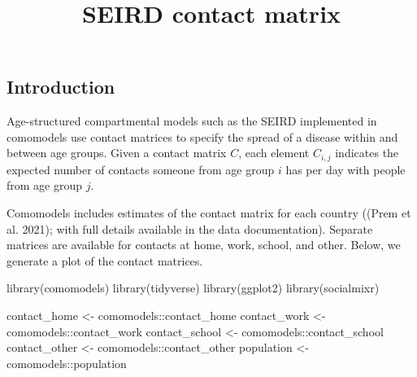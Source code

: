 \documentclass[
]{article}
\title{SEIRD contact matrix}
\author{}
\date{\vspace{-2.5em}}
\newenvironment{Shaded}{\begin{snugshade}}{\end{snugshade}}
\newcommand{\FunctionTok}[1]{\textcolor[rgb]{0.00,0.00,0.00}{#1}}
\newcommand{\NormalTok}[1]{#1}
\newcommand{\OtherTok}[1]{\textcolor[rgb]{0.56,0.35,0.01}{#1}}
\newcommand{\SpecialCharTok}[1]{\textcolor[rgb]{0.00,0.00,0.00}{#1}}
\begin{document}
\maketitle

\hypertarget{introduction}{%
\subsection{Introduction}\label{introduction}}

Age-structured compartmental models such as the SEIRD implemented in
comomodels use contact matrices to specify the spread of a disease
within and between age groups. Given a contact matrix \(C\), each
element \(C_{i,j}\) indicates the expected number of contacts someone
from age group \(i\) has per day with people from age group \(j\).

Comomodels includes estimates of the contact matrix for each country
((Prem et al. 2021); with full details available in the data
documentation). Separate matrices are available for contacts at home,
work, school, and other. Below, we generate a plot of the contact
matrices.

\begin{Shaded}
\begin{Highlighting}[]
\FunctionTok{library}\NormalTok{(comomodels)}
\FunctionTok{library}\NormalTok{(tidyverse)}
\FunctionTok{library}\NormalTok{(ggplot2)}
\FunctionTok{library}\NormalTok{(socialmixr)}
\end{Highlighting}
\end{Shaded}

\begin{Shaded}
\begin{Highlighting}[]
\NormalTok{contact\_home }\OtherTok{\textless{}{-}}\NormalTok{ comomodels}\SpecialCharTok{::}\NormalTok{contact\_home}
\NormalTok{contact\_work }\OtherTok{\textless{}{-}}\NormalTok{ comomodels}\SpecialCharTok{::}\NormalTok{contact\_work}
\NormalTok{contact\_school }\OtherTok{\textless{}{-}}\NormalTok{ comomodels}\SpecialCharTok{::}\NormalTok{contact\_school}
\NormalTok{contact\_other }\OtherTok{\textless{}{-}}\NormalTok{ comomodels}\SpecialCharTok{::}\NormalTok{contact\_other}
\NormalTok{population }\OtherTok{\textless{}{-}}\NormalTok{ comomodels}\SpecialCharTok{::}\NormalTok{population}
\end{Highlighting}
\end{Shaded}
\end{document}
